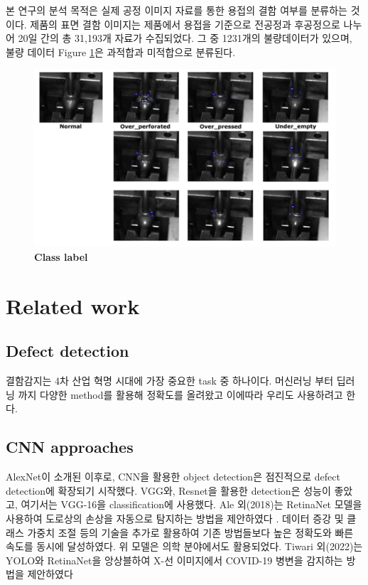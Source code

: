 \documentclass[10pt,twocolumn,letterpaper]{article}
\begin{document}
본 연구의 분석 목적은 실제 공정 이미지 자료를 통한 용접의 결함 여부를 분류하는 것이다. 제품의 표면 결함 이미지는 제품에서 용접을 기준으로 전공정과 후공정으로 나누어 20일 간의 총 31,193개 자료가 수집되었다. 그 중 1231개의 불량데이터가 있으며, 불량 데이터 Figure \ref{dataset}은 과적합과 미적합으로 분류된다. 
\begin{figure}[t]
  \includegraphics[width=\linewidth]{figure/dataset}
     \caption{\small \textbf{Class label} }
  \label{dataset}
  \end{figure}


\section{Related work}
\subsection{Defect detection}
결함감지는 4차 산업 혁명 시대에 가장 중요한 task 중 하나이다.
머신러닝 부터 딥러닝 까지 다양한 method를 활용해 정확도를 올려왔고
이에따라 우리도 사용하려고 한다.
\subsection{CNN approaches}
AlexNet이 소개된 이후로, CNN을 활용한 object detection은 점진적으로 defect detection에 
확장되기 시작했다. VGG와, Resnet을 활용한 detection은 성능이 좋았고, 
여기서는 VGG-16을 classification에 사용했다.
Ale 외(2018)는 RetinaNet 모델을 사용하여 도로상의 손상을 자동으로 탐지하는 방법을 제안하였다 . 데이터 증강 및 클래스 가중치 조절 등의 기술을 추가로 활용하여 기존 방법들보다 높은 정확도와 빠른 속도를 동시에 달성하였다. 위 모델은 의학 분야에서도 활용되었다. Tiwari 외(2022)는 YOLO와 RetinaNet을 앙상블하여 X-선 이미지에서 COVID-19 병변을 감지하는 방법을 제안하였다
\end{document}
